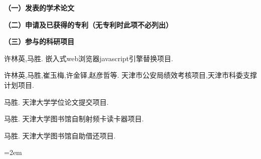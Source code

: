 
\begin{reseachlog}
\setlength{\parindent}{0em}
\textbf{（一）发表的学术论文}

\textbf{（二）申请及已获得的专利（无专利时此项不必列出）}

\textbf{（三）参与的科研项目}
\begin{enumerate}[{[}1{]}]
\item   许林英,马胜. 嵌入式web浏览器javascript引擎替换项目.
\item   许林英,马胜,崔玉梅,许金铎,赵彦哲等. 天津市公安局绩效考核项目,天津市科委支撑计划项目.
\item   马胜. 天津大学学位论文提交项目.
\item   马胜. 天津大学图书馆自制射频卡读卡器项目.
\item   马胜. 天津大学图书馆自助借还项目.
\end{enumerate}
\vfill
{}\hangindent=2em\noindent

\setlength{\parindent}{2em}
\end{reseachlog}
